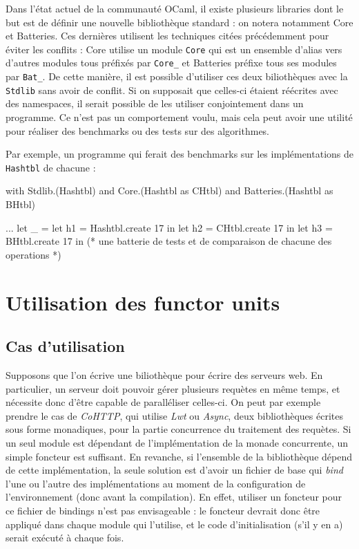 \documentclass[11pt,a4paper]{report}
\begin{document}
Dans l'état actuel de la communauté OCaml, il existe plusieurs libraries dont le
but est de définir une nouvelle bibliothèque standard : on notera notamment Core
et Batteries. Ces dernières utilisent les techniques citées précédemment pour
éviter les conflits : Core utilise un module \texttt{Core} qui est un ensemble
d'alias vers d'autres modules tous préfixés par \texttt{Core_} et Batteries
préfixe tous ses modules par \texttt{Bat_}. De cette manière, il est possible
d'utiliser ces deux biliothèques avec la \texttt{Stdlib} sans avoir de
conflit. Si on supposait que celles-ci étaient réécrites avec des namespaces, il
serait possible de les utiliser conjointement dans un programme. Ce n'est pas un
comportement voulu, mais cela peut avoir une utilité pour réaliser des
benchmarks ou des tests sur des algorithmes.

Par exemple, un programme qui ferait des benchmarks sur les implémentations de
\texttt{Hashtbl} de chacune :
\begin{OCaml}
with Stdlib.(Hashtbl)
and Core.(Hashtbl as CHtbl)
and Batteries.(Hashtbl as BHtbl)

...
let _ =
  let h1 = Hashtbl.create 17 in
  let h2 = CHtbl.create 17 in
  let h3 = BHtbl.create 17 in
  (* une batterie de tests et de comparaison de chacune des operations *)
\end{OCaml}


\section{Utilisation des functor units}

\subsection{Cas d'utilisation}

Supposons que l'on écrive une biliothèque pour écrire des serveurs web. En
particulier, un serveur doit pouvoir gérer plusieurs requètes en même temps, et
nécessite donc d'être capable de paralléliser celles-ci. On peut par exemple
prendre le cas de \emph{CoHTTP}, qui utilise \emph{Lwt} ou \emph{Async}, deux
bibliothèques écrites sous forme monadiques, pour la partie concurrence du
traitement des requètes. Si un seul module est dépendant de l'implémentation de
la monade concurrente, un simple foncteur est suffisant. En revanche, si
l'ensemble de la bibliothèque dépend de cette implémentation, la seule solution
est d'avoir un fichier de base qui \emph{bind} l'une ou l'autre des
implémentations au moment de la configuration de l'environnement (donc avant la
compilation). En effet, utiliser un foncteur pour ce fichier de bindings n'est
pas envisageable : le foncteur devrait donc être appliqué dans chaque module qui
l'utilise, et le code d'initialisation (s'il y en a) serait exécuté à chaque
fois.
\end{document}
